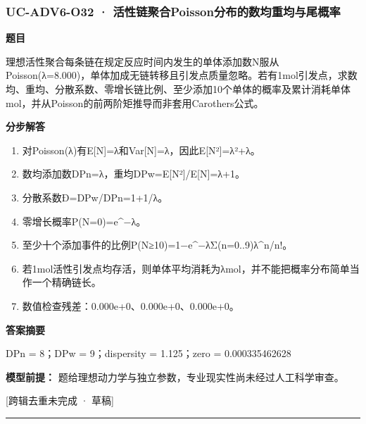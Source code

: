 \documentclass[UTF8,11pt,a4paper]{ctexart}
\begin{document}
\subsubsection*{UC-ADV6-O32 · 活性链聚合Poisson分布的数均重均与尾概率}
\noindent\textbf{题目}\par
理想活性聚合每条链在规定反应时间内发生的单体添加数N服从Poisson(λ=8.000)，单体加成无链转移且引发点质量忽略。若有1mol引发点，求数均、重均、分散系数、零增长链比例、至少添加10个单体的概率及累计消耗单体mol，并从Poisson的前两阶矩推导而非套用Carothers公式。\par
\medskip\noindent\textbf{分步解答}
\begin{enumerate}
\item 对Poisson(λ)有E[N]=λ和Var[N]=λ，因此E[N²]=λ²+λ。
\item 数均添加数DPn=λ，重均DPw=E[N²]/E[N]=λ+1。
\item 分散系数Đ=DPw/DPn=1+1/λ。
\item 零增长概率P(N=0)=e\textasciicircum{}−λ。
\item 至少十个添加事件的比例P(N≥10)=1−e\textasciicircum{}−λΣ(n=0..9)λ\textasciicircum{}n/n!。
\item 若1mol活性引发点均存活，则单体平均消耗为λmol，并不能把概率分布简单当作一个精确链长。
\item 数值检查残差：0.000e+0、0.000e+0、0.000e+0。
\end{enumerate}
\noindent\textbf{答案摘要}\par
DPn = 8；DPw = 9；dispersity = 1.125；zero = 0.000335462628\par
\noindent\textbf{模型前提：}
题给理想动力学与独立参数，专业现实性尚未经过人工科学审查。\par
\noindent\textcolor{red!65!black}{[跨辑去重未完成 · 草稿]} \par
\medskip\hrule\medskip
{}
\end{document}
